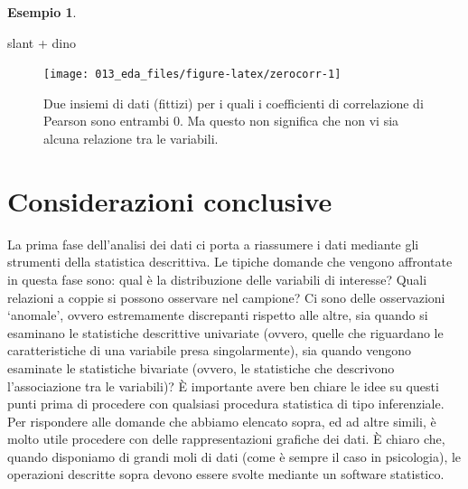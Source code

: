 \documentclass[
  10pt,
  italian,
  a4paper,
  extrafontsizes,onecolumn,openright
  ]{memoir}
\makeatletter
\newenvironment{Shaded}{\begin{snugshade}}{\end{snugshade}}
\newcommand{\NormalTok}[1]{#1}
\newcommand{\SpecialCharTok}[1]{\textcolor[rgb]{0.00,0.00,0.00}{#1}}
\newcommand{\MemoirChapStyle}{daleif1}
\newcommand{\MemoirPageStyle}{Ruled}
\newlength\widthw %
\newcommand*{\SmallMargins}{
  \setlrmarginsandblock{1.5in}{1.5in}{*}
  \setmarginnotes{0.1in}{0.1in}{0.1in}
 \setulmarginsandblock{1.5in}{1in}{*}
  \checkandfixthelayout
  \ch@ngetext
  \clearpage
  \setlength{\widthw}{\textwidth+\marginparsep+\marginparwidth}
  \footnotesatfoot
  \chapterstyle{\MemoirChapStyle}  %
  \pagestyle{\MemoirPageStyle}
}
\theoremstyle{definition}
\theoremstyle{definition}
\newtheorem{example}{Esempio}[chapter]
\theoremstyle{definition}
\theoremstyle{definition}
\theoremstyle{remark}
\makeatother
\begin{document}
\begin{example}
\begin{Shaded}
\begin{Highlighting}[]
\NormalTok{slant }\SpecialCharTok{+}\NormalTok{ dino}
\end{Highlighting}
\end{Shaded}

\begin{figure}[h]

{\centering \texttt{[image: 013\_eda\_files/figure-latex/zerocorr-1]} 

}

\caption{Due insiemi di dati (fittizi) per i quali i coefficienti di correlazione di Pearson sono entrambi 0. Ma questo non significa che non vi sia alcuna relazione tra le variabili.}\label{fig:zerocorr}
\end{figure}

\end{example}

\hypertarget{considerazioni-conclusive}{%
\section*{Considerazioni conclusive}\label{considerazioni-conclusive}}

La prima fase dell'analisi dei dati ci porta a riassumere i dati mediante gli strumenti della statistica descrittiva.
Le tipiche domande che vengono affrontate in questa fase sono: qual è la
distribuzione delle variabili di interesse? Quali relazioni a coppie si
possono osservare nel campione? Ci sono delle osservazioni `anomale',
ovvero estremamente discrepanti rispetto alle altre, sia quando si
esaminano le statistiche descrittive univariate (ovvero, quelle che
riguardano le caratteristiche di una variabile presa singolarmente), sia
quando vengono esaminate le statistiche bivariate (ovvero, le
statistiche che descrivono l'associazione tra le variabili)? È
importante avere ben chiare le idee su questi punti prima di procedere
con qualsiasi procedura statistica di tipo inferenziale. Per rispondere
alle domande che abbiamo elencato sopra, ed ad altre simili, è molto
utile procedere con delle rappresentazioni grafiche dei dati. È chiaro che, quando disponiamo di grandi moli di dati (come è sempre il caso in psicologia), le operazioni descritte sopra devono essere svolte mediante un software statistico.



\backmatter
\SmallMargins

\printbibliography
\onecolumn
\end{document}
